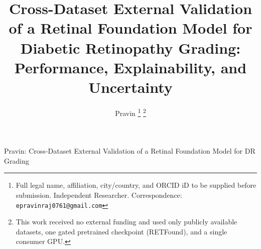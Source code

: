 \documentclass[journal]{IEEEtran}
\begin{document}
\title{Cross-Dataset External Validation of a Retinal Foundation Model for
Diabetic Retinopathy Grading: Performance, Explainability, and Uncertainty}

\author{Pravin%
\thanks{Full legal name, affiliation, city/country, and ORCID iD to be supplied
before submission. Independent Researcher. Correspondence:
\texttt{epravinraj0761@gmail.com}}%
\thanks{This work received no external funding and used only publicly available
datasets, one gated pretrained checkpoint (RETFound), and a single consumer GPU.}}

%
{Pravin: Cross-Dataset External Validation of a Retinal Foundation Model for DR Grading}

\maketitle
\end{document}
